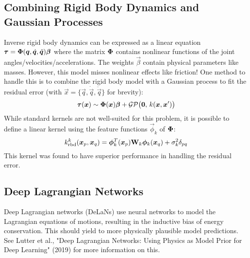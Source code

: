		\subsection{Combining Rigid Body Dynamics and Gaussian Processes}
			Inverse rigid body dynamics can be expressed as a linear equation \( \bm{\tau} = \bm{\mathrm{\Phi}}(\bm{q}, \dot{\bm{q}}, \ddot{\bm{q}}) \bm{\beta} \) where the matrix \( \bm{\mathrm{\Phi}} \) contains nonlinear functions of the joint angles/velocities/accelerations. The weights \(\vec{\beta}\) contain physical parameters like masses. However, this model misses nonlinear effects like friction! One method to handle this is to combine the rigid body model with a Gaussian process to fit the residual error (with \( \vec{x} = \{ \vec{q}, \dot{\vec{q}}, \ddot{\vec{q}} \} \) for brevity):
			\begin{equation*}
				\bm{\tau}(\bm{x}) \sim \bm{\mathrm{\Phi}}(\bm{x}) \bm{\beta} + \mathcal{GP}\big( \bm{0},\, k(\bm{x}, \bm{x}') \big)
			\end{equation*}
			While standard kernels are not well-suited for this problem, it is possible to define a linear kernel using the feature functions \(\vec{\phi}_k\) of \(\bm{\mathrm{\Phi}}\):
			\begin{equation*}
				k_\mathrm{rbd}^k(\bm{x}_p, \bm{x}_q) = \bm{\phi}_k^T(\bm{x}_p) \bm{\mathrm{W}}_k \bm{\phi}_k(\bm{x}_q) + \sigma_k^2 \delta_{pq}
			\end{equation*}
			This kernel was found to have superior performance in handling the residual error.

		\subsection{Deep Lagrangian Networks}
			Deep Lagrangian networks (DeLaNs) use neural networks to model the Lagrangian equations of motions, resulting in the inductive bias of energy conservation. This should yield to more physically plausible model predictions. See Lutter et al., "Deep Lagrangian Networks: Using Physics as Model Prior for Deep Learning" (2019) for more information on this.

